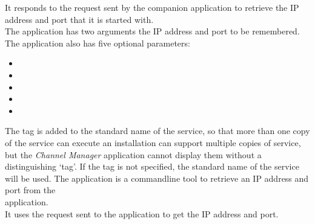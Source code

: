 It responds to the  request sent by the
companion application  to retrieve the IP address and port
that it is started with.\\

The application has two arguments \longDash{} the IP address and port to be remembered.
The application also has five optional parameters:
\begin{itemize}
\item{}
\item\exSp{}
\item\exSp{}
\item\exSp{}
\item\exSp{}
\end{itemize}
The tag is added to the standard name of the service, so that more than one copy of the
service can execute \longDash{} an \mplusm{} installation can support multiple copies of 
 service, but the \emph{Channel Manager} application
cannot display them without a distinguishing `tag'.
If the tag is not specified, the standard name of the service will be used.
The  application is a command\longDash{}line tool to
retrieve an IP address and port from the\\
 application.\\

It uses the  request sent to the
 application to get the IP address and port.\\


